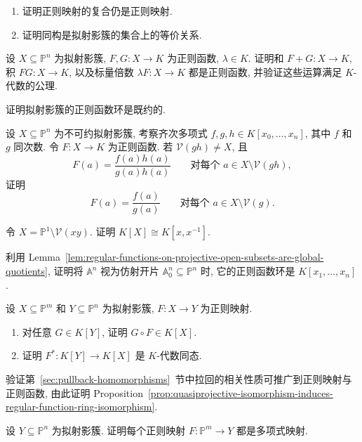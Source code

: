 \BookExerciseHeading
\begin{BookExercises}
  \item\label{ex:quasiprojective-regular-composition-and-isomorphism-relation}
  \begin{enumerate}
    \item 证明正则映射的复合仍是正则映射.
    \item 证明同构是拟射影簇的集合上的等价关系.
  \end{enumerate}
  \item\label{ex:regular-functions-form-algebra} 设 $X\subseteq\mathbb{P}^{n}$ 为拟射影簇, $F,G:X\to K$ 为正则函数, $\lambda\in K$. 证明和 $F+G:X\to K$, 积 $FG:X\to K$, 以及标量倍数 $\lambda F:X\to K$ 都是正则函数, 并验证这些运算满足 $K$-代数的公理.
  \item\label{ex:regular-function-ring-is-reduced} 证明拟射影簇的正则函数环是既约的.
  \item\label{ex:cancel-common-factors-in-regular-function} 设 $X\subseteq\mathbb{P}^{n}$ 为不可约拟射影簇, 考察齐次多项式 $f,g,h\in K[x_{0},\ldots,x_{n}]$, 其中 $f$ 和 $g$ 同次数. 令 $F:X\to K$ 为正则函数. 若 $\mathcal{V}(gh)\ne X$, 且
  \[
    F(a)=\frac{f(a)h(a)}{g(a)h(a)}
    \qquad\text{对每个 }a\in X\setminus\mathcal{V}(gh),
  \]
  证明
  \[
    F(a)=\frac{f(a)}{g(a)}\qquad\text{对每个 }a\in X\setminus\mathcal{V}(g).
  \]
  \item\label{ex:isomorphism-with-laurent-polynomial-ring} 令 $X=\mathbb{P}^{1}\setminus\mathcal{V}(xy)$. 证明 $K[X]\cong K[x,x^{-1}]$.
  \item\label{ex:regular-function-ring-of-affine-space} 利用 Lemma~\ref{lem:regular-functions-on-projective-open-subsets-are-global-quotients}, 证明将 $\mathbb{A}^{n}$ 视为仿射开片 $\mathbb{A}^{n}_{0}\subseteq\mathbb{P}^{n}$ 时, 它的正则函数环是 $K[x_{1},\ldots,x_{n}]$.
  \item\label{ex:pullback-regular-functions-is-algebra-homomorphism} 设 $X\subseteq\mathbb{P}^{m}$ 和 $Y\subseteq\mathbb{P}^{n}$ 为拟射影簇, $F:X\to Y$ 为正则映射.
  \begin{enumerate}
    \item 对任意 $G\in K[Y]$, 证明 $G\circ F\in K[X]$.
    \item 证明 $F^{*}:K[Y]\to K[X]$ 是 $K$-代数同态.
  \end{enumerate}
  \item\label{ex:ring-invariance-under-quasiprojective-isomorphism} 验证第~\ref{sec:pullback-homomorphisms}~节中拉回的相关性质可推广到正则映射与正则函数, 由此证明 Proposition~\ref{prop:quasiprojective-isomorphism-induces-regular-function-ring-isomorphism}.
  \item\label{ex:regular-map-from-projective-space-is-polynomial} 设 $Y\subseteq\mathbb{P}^{n}$ 为拟射影簇. 证明每个正则映射 $F:\mathbb{P}^{m}\to Y$ 都是多项式映射.
\end{BookExercises}
